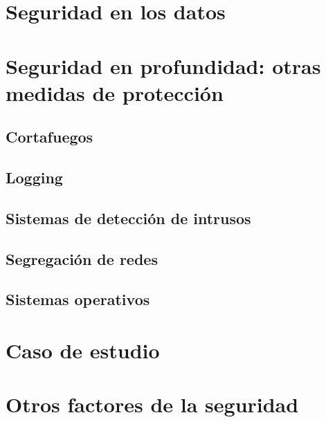 \documentclass[11pt,a4paper]{article}
\begin{document}
\section{Seguridad en los datos}

\section{Seguridad en profundidad: otras medidas de protección}

\subsection{Cortafuegos}

\subsection{Logging}

\subsection{Sistemas de detección de intrusos}

\subsection{Segregación de redes}

\subsection{Sistemas operativos}

\section{Caso de estudio}

\section{Otros factores de la seguridad}
\end{document}
